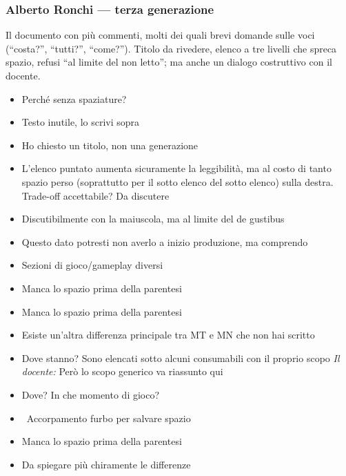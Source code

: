 \subsubsection{Alberto Ronchi --- terza generazione}
Il documento con più commenti, molti dei quali brevi domande sulle voci
(``costa?'', ``tutti?'', ``come?''). Titolo da rivedere, elenco a tre livelli
che spreca spazio, refusi ``al limite del non letto''; ma anche un dialogo
costruttivo con il docente.
{\small
\begin{itemize}
  \item {} Perché senza spaziature?
  \item {} Testo inutile, lo scrivi sopra
  \item {} Ho chiesto un titolo, non una generazione
  \item {} L'elenco puntato aumenta sicuramente la leggibilità, ma al costo di tanto spazio perso (soprattutto per il sotto elenco del sotto elenco) sulla destra. Trade-off accettabile? Da discutere
  \item {} Discutibilmente con la maiuscola, ma al limite del de gustibus
  \item {} Questo dato potresti non averlo a inizio produzione, ma comprendo
  \item {} Sezioni di gioco/gameplay diversi
  \item \rvAncora{(} Manca lo spazio prima della parentesi
  \item \rvAncora{(} Manca lo spazio prima della parentesi
  \item {} Esiste un'altra differenza principale tra MT e MN che non hai scritto
  \item {} Dove stanno?  Sono elencati sotto alcuni consumabili con il proprio scopo \emph{Il docente:} Però lo scopo generico va riassunto qui
  \item {} Dove? In che momento di gioco?
  \item {} \rvBene\ Accorpamento furbo per salvare spazio
  \item \rvAncora{(} Manca lo spazio prima della parentesi
  \item {} Da spiegare più chiramente le differenze

\end{itemize}}
